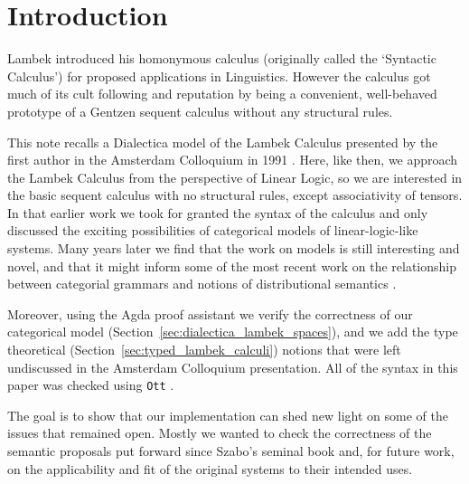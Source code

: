 \documentclass{entcs}
\begin{document}
\section*{Introduction}
Lambek introduced his homonymous calculus (originally called the
`Syntactic Calculus') for proposed applications in Linguistics.
However the calculus got much of its cult following and reputation by
being a convenient, well-behaved prototype of a Gentzen sequent
calculus without any structural rules.

This note recalls a Dialectica model of the Lambek Calculus presented
by the first author in the Amsterdam Colloquium in 1991
\cite{depaiva1991}. Here, like then, we approach the Lambek Calculus
from the perspective of Linear Logic, so we are interested in the
basic sequent calculus with no structural rules, except associativity
of tensors. In that earlier work we took for granted the syntax of the
calculus and only discussed the exciting possibilities of categorical
models of linear-logic-like systems.  Many years later we find that
the work on models is still interesting and novel, and that it might
inform some of the most recent work on the relationship between
categorial grammars and notions of distributional semantics
\cite{coecke2013}.


Moreover, using the Agda proof assistant \cite{bove2009} we verify the
correctness of our categorical model
(Section~\ref{sec:dialectica_lambek_spaces}), and we add the type
theoretical (Section~\ref{sec:typed_lambek_calculi}) notions that were
left undiscussed in the Amsterdam Colloquium presentation.  All of the
syntax in this paper was checked using \texttt{Ott}
\cite{Sewell:2010}.

The goal is to show that our implementation can shed new light on some
of the issues that remained open.  Mostly we wanted to check the
correctness of the semantic proposals put forward since Szabo's
seminal book \cite{szabo1978} and, for future work, on the
applicability and fit of the original systems to their intended uses.
\end{document}
